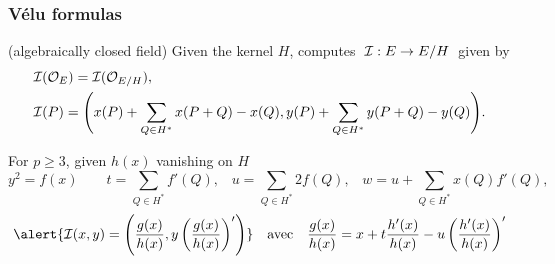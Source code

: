 \documentclass[10pt]{beamer}
\begin{document}


\begin{frame}
  \frametitle{Vélu formulas}
  
  \begin{block}{\cite{velu71} (algebraically closed field)}
    Given the kernel $H$, computes $\;\mathcal{I} : E\to E/H\;$ given by
    \begin{align*}
      &\mathcal{I}(\mathcal{O}_E) = \mathcal{I}(\mathcal{O}_{E/H})\text{,}\\
      &\begin{aligned}
        \mathcal{I}(P) = \Biggl(x(P) + \sum_{Q\in H^\ast}x(P+Q) - x(Q),
        y(P) + \sum_{Q\in H^\ast}y(P+Q) - y(Q) \Biggr) \text{.}
      \end{aligned}
    \end{align*}
  \end{block}

  \begin{block}{For $p\ge 3$, given $h(x)$ vanishing on $H$}
    {\footnotesize
      \[
      y^2 = f(x)
      \qquad
      t = \sum_{Q\in H^\ast} f'(Q)\text{,}
      \quad
      u = \sum_{Q\in H^\ast} 2f(Q)\text{,}
      \quad
      w = u + \sum_{Q\in H^\ast} x(Q)f'(Q)\text{,}\]}
    \[\alert{\I(x,y) = \left(\frac{g(x)}{h(x)}, y\left(\frac{g(x)}{h(x)}\right)'\right)}
    \quad\text{avec}\quad
    \frac{g(x)}{h(x)} = x + t\frac{h'(x)}{h(x)} - u\left(\frac{h'(x)}{h(x)}\right)'\]
  \end{block}
\end{frame}

\end{document}
